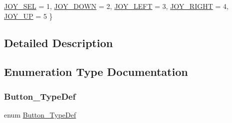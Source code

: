 \begin{DoxyCompactItemize}
\mbox{\hyperlink{group___s_t_m32_f1_x_x___n_u_c_l_e_o___l_o_w___l_e_v_e_l___exported___types_gga7466d9ae142b713772373c9ddfc90332a74f232481a3618b8fd5df46d4525f20d}{J\+O\+Y\+\_\+\+S\+EL}} = 1, 
\mbox{\hyperlink{group___s_t_m32_f1_x_x___n_u_c_l_e_o___l_o_w___l_e_v_e_l___exported___types_gga7466d9ae142b713772373c9ddfc90332a58ec7b8847be5467694d882fb1133a9c}{J\+O\+Y\+\_\+\+D\+O\+WN}} = 2, 
\mbox{\hyperlink{group___s_t_m32_f1_x_x___n_u_c_l_e_o___l_o_w___l_e_v_e_l___exported___types_gga7466d9ae142b713772373c9ddfc90332ae07924a05c719edda9d15bdf369c134d}{J\+O\+Y\+\_\+\+L\+E\+FT}} = 3, 
\newline
\mbox{\hyperlink{group___s_t_m32_f1_x_x___n_u_c_l_e_o___l_o_w___l_e_v_e_l___exported___types_gga7466d9ae142b713772373c9ddfc90332a76c8c4e6d945b163ef1bd87e2e0b58aa}{J\+O\+Y\+\_\+\+R\+I\+G\+HT}} = 4, 
\mbox{\hyperlink{group___s_t_m32_f1_x_x___n_u_c_l_e_o___l_o_w___l_e_v_e_l___exported___types_gga7466d9ae142b713772373c9ddfc90332a05f25880b9a9ec098379c1f6be742682}{J\+O\+Y\+\_\+\+UP}} = 5
 \}
\end{DoxyCompactItemize}


\subsection{Detailed Description}


\subsection{Enumeration Type Documentation}
\mbox{\label{group___s_t_m32_f1_x_x___n_u_c_l_e_o___l_o_w___l_e_v_e_l___exported___types_ga643816dfbad5c734fc25a29ce8d35bb1}} 
\subsubsection{\texorpdfstring{Button\_TypeDef}{Button\_TypeDef}}
{\footnotesize\ttfamily enum \mbox{\hyperlink{group___s_t_m32_f1_x_x___n_u_c_l_e_o___l_o_w___l_e_v_e_l___exported___types_ga643816dfbad5c734fc25a29ce8d35bb1}{Button\+\_\+\+Type\+Def}}}

